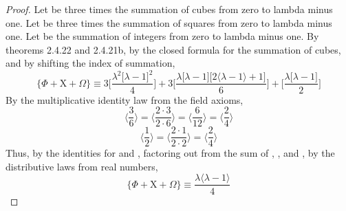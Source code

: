 \documentclass[a4paper, 12pt]{article}
\theoremstyle{plain}
\begin{document}
\begin{proof}
    Let \bm{$\Phi$} be three times the summation of cubes from zero to lambda minus one.
    Let  be three times the summation of squares from zero to lambda minus one.
    Let \bm{$\Omega$} be the summation of integers from zero to lambda minus one.
    By theorems 2.4.22 and 2.4.21b, 
    by the closed formula for the summation of cubes,
    and by shifting the index of summation,
    \begin{equation*}
        \Bigg \{
            \Phi + \mathrm{X} + \Omega
        \Bigg \}
            \equiv
        3
        \Bigg[
            \frac{
                \lambda ^2
                \big[ \lambda - 1 \big] ^2
            }
            {4}
        \Bigg]
            +
        3
        \Bigg[
            \frac{
                \lambda 
                \big[ \lambda - 1 \big]
                \big[ 2 \langle \lambda - 1 \rangle + 1 \big]
            }
            {6}
        \Bigg]
            +
        \Bigg[
            \frac{\lambda \big [ \lambda - 1 ]}
            {2}
        \Bigg]
    \end{equation*} 
    By the multiplicative identity law from the field axioms,
    \begin{equation*}
        \bigg \langle 
            \frac{3}{6}
        \bigg \rangle
             = 
        \bigg \langle
            \frac{2 \cdot 3}{2 \cdot 6} 
        \bigg \rangle 
            = 
        \bigg \langle
            \frac{6}{12} 
        \bigg \rangle 
            = 
        \bigg \langle
            \frac{2}{4}
        \bigg \rangle
    \end{equation*}
    \begin{equation*}
        \bigg \langle 
            \frac{1}{2}
        \bigg \rangle
            =
        \bigg \langle
            \frac{2 \cdot 1}{2 \cdot 2}
        \bigg \rangle
            =
        \bigg \langle 
            \frac{2}{4}
        \bigg \rangle
    \end{equation*}
    Thus, by the identities for  and \bm{$\Omega$},
    factoring 
    out from the sum of \bm{$\Phi$}, , and \bm{$\Omega$},
    by the distributive laws from real numbers,
    \begin{equation*}
        \Bigg \{
            \Phi + \mathrm{X} + \Omega
        \Bigg \}
                \equiv
            \frac{
                \lambda \big \langle \lambda - 1 \big \rangle
            }
            {4}

\end{equation*}
\end{proof}
\end{document}
